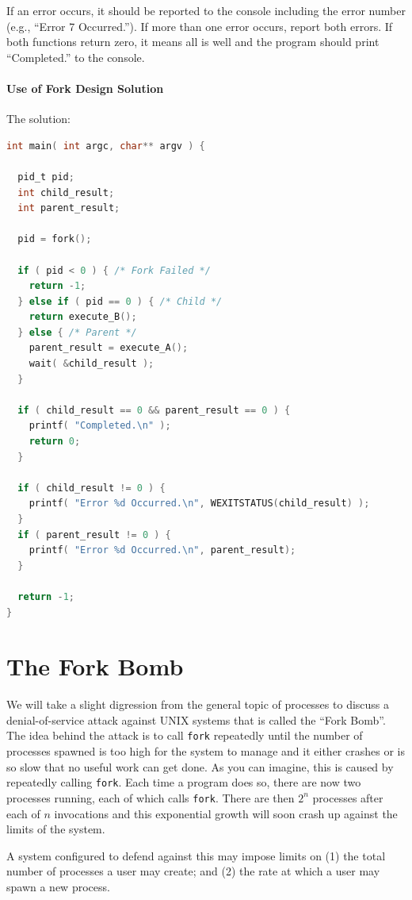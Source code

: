 If an error occurs, it should be reported to the console including the error number (e.g., ``Error 7 Occurred.''). If more than one error occurs, report both errors. If both functions return zero, it means all is well and the program should print ``Completed.'' to the console.

\paragraph{Use of Fork Design Solution} The solution:

\begin{lstlisting}[language=C]
int main( int argc, char** argv ) {

  pid_t pid;
  int child_result;
  int parent_result;

  pid = fork();
  
  if ( pid < 0 ) { /* Fork Failed */
    return -1;
  } else if ( pid == 0 ) { /* Child */
    return execute_B();
  } else { /* Parent */ 
    parent_result = execute_A();
    wait( &child_result );
  }
  
  if ( child_result == 0 && parent_result == 0 ) {
    printf( "Completed.\n" );
    return 0;
  }
  
  if ( child_result != 0 ) {
    printf( "Error %d Occurred.\n", WEXITSTATUS(child_result) );
  }
  if ( parent_result != 0 ) {
    printf( "Error %d Occurred.\n", parent_result);
  }
  
  return -1;
}
\end{lstlisting}


\section*{The Fork Bomb}

We will take a slight digression from the general topic of processes to discuss a denial-of-service attack against UNIX systems that is called the ``Fork Bomb''. The idea behind the attack is to call \texttt{fork} repeatedly until the number of processes spawned is too high for the system to manage and it either crashes or is so slow that no useful work can get done. As you can imagine, this is caused by repeatedly calling \texttt{fork}. Each time a program does so, there are now two processes running, each of which calls \texttt{fork}. There are then $2^{n}$ processes after each of $n$ invocations and this exponential growth will soon crash up against the limits of the system.

A system configured to defend against this may impose limits on (1) the total number of processes a user may create; and (2) the rate at which a user may spawn a new process.

